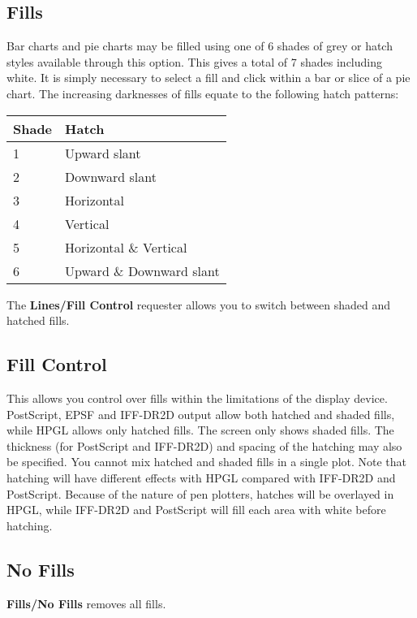 \subsection{Fills}
\label{ss:fill}
Bar charts  and pie charts  may be filled 
using one of 6 shades of grey or hatch styles available 
through this option. This gives a total of 7 shades including white. It is simply 
necessary to select a fill and click within a bar or slice of a pie chart. The 
increasing darknesses  of fills equate to the following hatch patterns:
\begin{center}
\begin{tabular}{|l|l|} \hline
Shade &  Hatch                      \\ \hline
1     &  Upward slant               \\
2     &  Downward slant             \\
3     &  Horizontal                 \\
4     &  Vertical                   \\
5     &  Horizontal \& Vertical     \\
6     &  Upward \& Downward slant   \\ \hline
\end{tabular}
\end{center}
The {\bf Lines/Fill Control} requester allows you to switch between shaded and 
hatched fills.


\subsection{Fill Control}
This allows you control over fills within the 
limitations of the display 
device. PostScript, EPSF and IFF-DR2D output allow both hatched and 
shaded fills, while HPGL allows only hatched fills. The screen only shows 
shaded fills. The thickness (for PostScript and IFF-DR2D) and spacing of 
the hatching may also be specified. You cannot mix hatched and shaded fills in a 
single plot. Note that hatching will have different effects with HPGL compared with 
IFF-DR2D and PostScript. Because of the nature of pen plotters, hatches will be 
overlayed in HPGL, while IFF-DR2D and PostScript will fill each area with white 
before hatching.

\subsection{No Fills}
{\bf Fills/No Fills} removes all fills.

